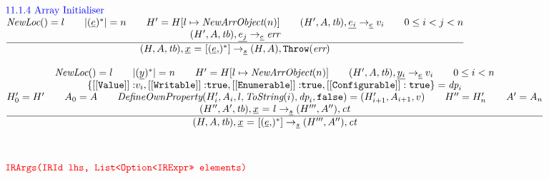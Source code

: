 \[\begin{array}{l@{~~}l@{~~}ll}
\mbox{\inblue 11.1.4 Array Initialiser}\\
\frac{\begin{matrix}
\hf{NewLoc}() = l
\rulesep
|(\irexpr)^*| = n
\rulesep
H' = H[l \mapsto \hf{NewArrObject}(n)]
\rulesep
(H',A,\tb), \ir{e_i} \rightarrow_{\ir\expr} v_i
\rulesep
0 \le i < j < n
\\
(H', A, \tb), \ir{e_j} \rightarrow_{\ir{\expr}} \err
\end{matrix}}{\begin{matrix}
\state, \irarr \rightarrow_{\ir\stmt} \res, {\tt Throw}(\err)
\end{matrix}}
\\\\

\frac{\begin{matrix}
\hf{NewLoc}() = l
\rulesep
|(\ir{y})^*| = n
\rulesep
H' = H[l \mapsto \hf{NewArrObject}(n)]
\rulesep
(H',A,\tb), \ir{y_i} \rightarrow_{\ir\expr} v_i
\rulesep
0 \le i < n
\\
\{{\tt [[Value]]:}v_i, {\tt [[Writable]]:}\true, {\tt [[Enumerable]]:}\true,
 {\tt [[Configurable]]:\true}\} = \emph{dp}_i
\\
H'_0 = H'
\rulesep
A_0 = A
\rulesep
\hf{DefineOwnProperty}(H'_i,A_i,l,\hf{ToString}(i)
, \emph{dp}_i, \false) = (H'_{i+1},A_{i+1},v)
\rulesep
H'' = H'_{n}
\rulesep
A' = A_{n}
\\
(H'',A',\tb), \irid \ {\tt =} \ l \rightarrow_{\ir\stmt} (H''',A''), \ct
\end{matrix}}{\begin{matrix}
\state, \irarr \rightarrow_{\ir\stmt} (H''',A''), \ct
\end{matrix}}
\\[4em]

\mtt{\normalsize\inred IRArgs(IRId lhs, List<Option<IRExpr>> elements)}\\[4em]

\end{array}
\]


